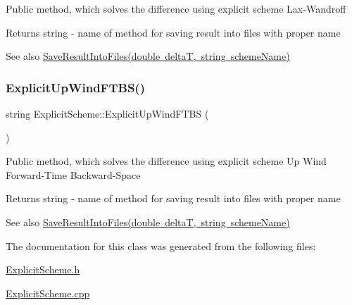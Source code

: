 Public method, which solves the difference using explicit scheme Lax-\/\+Wandroff \begin{DoxyReturn}{Returns}
string -\/ name of method for saving result into files with proper name 
\end{DoxyReturn}
\begin{DoxySeeAlso}{See also}
\mbox{\hyperlink{class_scheme_ae4512b4c8ead4d8ced95174f0b241f8a}{Save\+Result\+Into\+Files(double delta\+T, string scheme\+Name)}} 
\end{DoxySeeAlso}
\mbox{\label{class_explicit_scheme_a52c0d19315a6014f43a9d007c70582d6}} 
\subsubsection{\texorpdfstring{Explicit\+Up\+Wind\+F\+T\+B\+S()}{ExplicitUpWindFTBS()}}
{\footnotesize\ttfamily string Explicit\+Scheme\+::\+Explicit\+Up\+Wind\+F\+T\+BS (\begin{DoxyParamCaption}{ }\end{DoxyParamCaption})}

Public method, which solves the difference using explicit scheme Up Wind Forward-\/\+Time Backward-\/\+Space \begin{DoxyReturn}{Returns}
string -\/ name of method for saving result into files with proper name 
\end{DoxyReturn}
\begin{DoxySeeAlso}{See also}
\mbox{\hyperlink{class_scheme_ae4512b4c8ead4d8ced95174f0b241f8a}{Save\+Result\+Into\+Files(double delta\+T, string scheme\+Name)}} 
\end{DoxySeeAlso}


The documentation for this class was generated from the following files\+:\begin{DoxyCompactItemize}
\item 
\mbox{\hyperlink{_explicit_scheme_8h}{Explicit\+Scheme.\+h}}\item 
\mbox{\hyperlink{_explicit_scheme_8cpp}{Explicit\+Scheme.\+cpp}}\end{DoxyCompactItemize}
